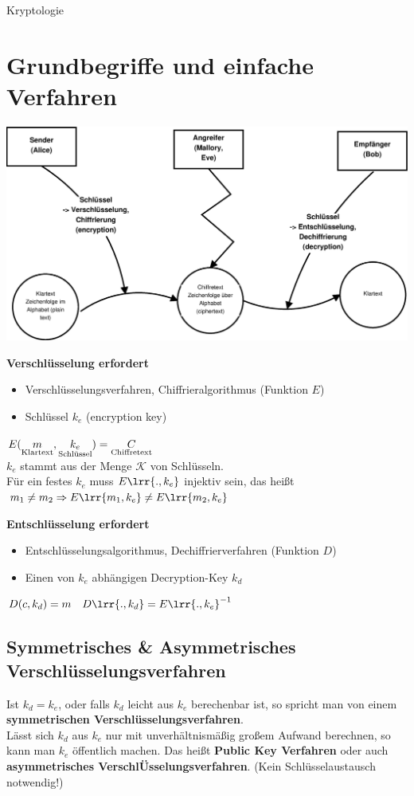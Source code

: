 \newpage
\begin{center}
	\huge{Kryptologie}
\end{center}
\section{Grundbegriffe und einfache Verfahren}
	\includegraphics[width=\textwidth]{eps/pic01.eps}

	\textbf{Verschlüsselung erfordert}
	\begin{itemize}
		\item Verschlüsselungsverfahren, Chiffrieralgorithmus (Funktion $E$)
		\item Schlüssel $k_e$ (encryption key)
	\end{itemize}
	$E(\underset{\mbox{\scriptsize Klartext}}{m},\underset{\mbox{\scriptsize Schlüssel}}{k_e})=\underset{\mbox{\scriptsize Chiffretext}}{C}$ \\
	$k_e$ stammt aus der Menge $\mathcal{K}$ von Schlüsseln.\\
	Für ein festes $k_e$ muss $E\lrr{.,k_e}$ injektiv sein, das heißt\\
	$m_1\neq m_2 \Rightarrow E\lrr{m_1,k_e}\neq E\lrr{m_2,k_e}$
	
	\textbf{Entschlüsselung erfordert}
	\begin{itemize}
		\item Entschlüsselungsalgorithmus, Dechiffrierverfahren (Funktion $D$)
		\item Einen von $k_e$ abhängigen Decryption-Key $k_d$
	\end{itemize}
	$D(c,k_d)=m\quad D\lrr{.,k_d}=E\lrr{.,k_e}^{-1}$
	\subsection{Symmetrisches \& Asymmetrisches Verschlüsselungsverfahren}
		Ist $k_d=k_e$, oder falls $k_d$ leicht aus $k_e$ berechenbar ist, so spricht man von einem \textbf{symmetrischen Verschlüsselungsverfahren}.\\
		Lässt sich $k_d$ aus $k_e$ nur mit unverhältnismäßig großem Aufwand berechnen, so kann man $k_e$ öffentlich machen. Das heißt \textbf{Public Key Verfahren} oder auch \textbf{asymmetrisches VerschlÜsselungsverfahren}. (Kein Schlüsselaustausch notwendig!)
	

